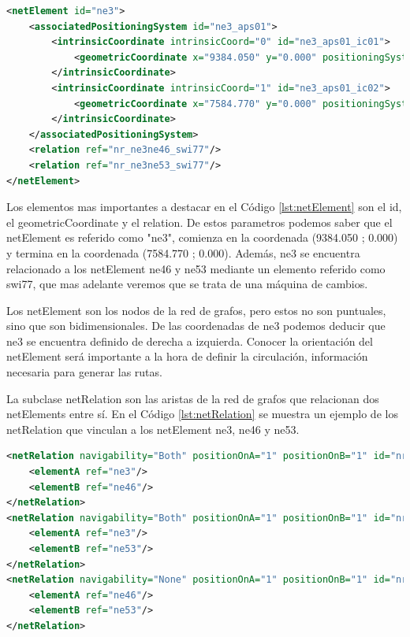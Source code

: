     \begin{lstlisting}[language = XML, caption = Clase netElement , label = {lst:netElement}]
<netElement id="ne3">
    <associatedPositioningSystem id="ne3_aps01">
        <intrinsicCoordinate intrinsicCoord="0" id="ne3_aps01_ic01">
            <geometricCoordinate x="9384.050" y="0.000" positioningSystemRef="gps01"/>
        </intrinsicCoordinate>
        <intrinsicCoordinate intrinsicCoord="1" id="ne3_aps01_ic02">
            <geometricCoordinate x="7584.770" y="0.000" positioningSystemRef="gps01"/>
        </intrinsicCoordinate>
    </associatedPositioningSystem>
    <relation ref="nr_ne3ne46_swi77"/>
    <relation ref="nr_ne3ne53_swi77"/>
</netElement>
    \end{lstlisting}
    
    Los elementos mas importantes a destacar en el Código \ref{lst:netElement} son el id, el geometricCoordinate y el relation. De estos parametros podemos saber que el netElement es referido como "ne3", comienza en la coordenada (9384.050 ; 0.000) y termina en la coordenada (7584.770 ; 0.000). Además, ne3 se encuentra relacionado a los netElement ne46 y ne53 mediante un elemento referido como swi77, que mas adelante veremos que se trata de una máquina de cambios.

    Los netElement son los nodos de la red de grafos, pero estos no son puntuales, sino que son bidimensionales. De las coordenadas de ne3 podemos deducir que ne3 se encuentra definido de derecha a izquierda. Conocer la orientación del netElement será importante a la hora de definir la circulación, información necesaria para generar las rutas.

    La subclase netRelation son las aristas de la red de grafos que relacionan dos netElements entre sí. En el Código \ref{lst:netRelation} se muestra un ejemplo de los netRelation que vinculan a los netElement ne3, ne46 y ne53.    
    
    \begin{lstlisting}[language = XML, caption = Clase netRelation , label = {lst:netRelation}]
<netRelation navigability="Both" positionOnA="1" positionOnB="1" id="nr_ne3ne46_swi77">
    <elementA ref="ne3"/>
    <elementB ref="ne46"/>
</netRelation>
<netRelation navigability="Both" positionOnA="1" positionOnB="1" id="nr_ne3ne53_swi77">
    <elementA ref="ne3"/>
    <elementB ref="ne53"/>
</netRelation>
<netRelation navigability="None" positionOnA="1" positionOnB="1" id="nr_ne46ne53_swi77">
    <elementA ref="ne46"/>
    <elementB ref="ne53"/>
</netRelation>
    \end{lstlisting}
    
